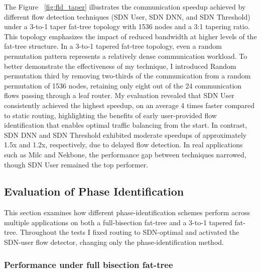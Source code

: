 The Figure ~\ref{fig:fld_taper} illustrates the communication speedup achieved by different flow detection techniques (SDN User, SDN DNN, and SDN Threshold) under a 3-to-1 taper fat-tree topology with 1536 nodes and a 3:1 tapering ratio. This topology emphasizes the impact of reduced bandwidth at higher levels of the fat-tree structure. In a 3-to-1 tapered fat-tree topology, even a random permutation pattern represents a relatively dense communication workload. To better demonstrate the effectiveness of my technique, I introduced Random permutation third by removing two-thirds of the communication from a random permutation of 1536 nodes, retaining only eight out of the 24 communication flows passing through a leaf router. My evaluation revealed that SDN User consistently achieved the highest speedup, on an average 4 times faster compared to static routing, highlighting the benefits of early user-provided flow identification that enables optimal traffic balancing from the start. In contrast, SDN DNN and SDN Threshold exhibited moderate speedups of approximately 1.5x and 1.2x, respectively, due to delayed flow detection. In real applications such as Milc and Nekbone, the performance gap between techniques narrowed, though SDN User remained the top performer. 

\subsection{Evaluation of Phase Identification}
This section examines how different phase-identification schemes perform across multiple applications on both a full-bisection fat-tree and a 3-to-1 tapered fat-tree. Throughout the tests I fixed routing to SDN-optimal and activated the SDN-user flow detector, changing only the phase-identification method.
\subsubsection{Performance under full bisection fat-tree}


